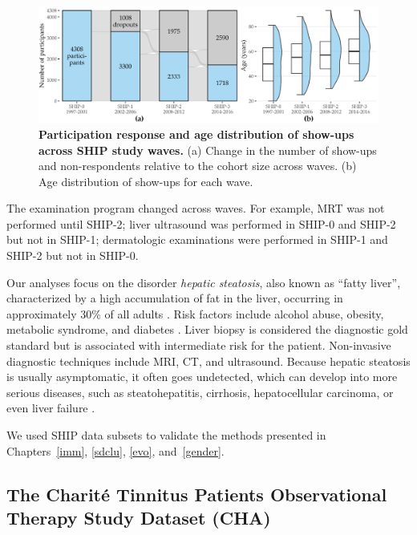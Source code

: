 \documentclass[
  oneside]{book}
\begin{document}
\begin{figure}[htb]

{\centering \includegraphics[width=1\linewidth]{figures/02-ship-sankey} 

}

\caption{\textbf{Participation response and age distribution of show-ups across SHIP study waves.} (a) Change in the number of show-ups and non-respondents relative to the cohort size across waves. (b) Age distribution of show-ups for each wave.}\label{fig:02-ship-sankey}
\end{figure}

The examination program changed across waves.
For example, MRT was not performed until SHIP-2; liver ultrasound was performed in SHIP-0 and SHIP-2 but not in SHIP-1; dermatologic examinations were performed in SHIP-1 and SHIP-2 but not in SHIP-0.

Our analyses focus on the disorder \emph{hepatic steatosis}, also known as ``fatty liver'', characterized by a high accumulation of fat in the liver, occurring in approximately 30\% of all adults \autocite{Voelzke:SHIP11,volzke2005hepatic}.
Risk factors include alcohol abuse, obesity, metabolic syndrome, and diabetes \autocite{volzke2012multicausality}.
Liver biopsy is considered the diagnostic gold standard \autocite{antunes2019fatty} but is associated with intermediate risk for the patient.
Non-invasive diagnostic techniques include MRI, CT, and ultrasound.
Because hepatic steatosis is usually asymptomatic, it often goes undetected, which can develop into more serious diseases, such as steatohepatitis, cirrhosis, hepatocellular carcinoma, or even liver failure \autocite{antunes2019fatty}.

We used SHIP data subsets to validate the methods presented in Chapters~\ref{imm}, \ref{sdclu}, \ref{evo}, and~\ref{gender}.

\hypertarget{background-data-cha}{%
\subsection{The Charité Tinnitus Patients Observational Therapy Study Dataset (CHA)}\label{background-data-cha}}
\end{document}
